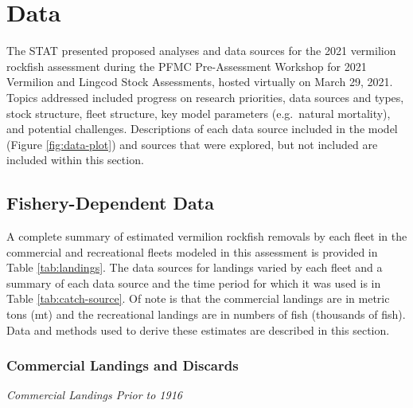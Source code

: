 \documentclass[
  english,
  a4paper,
]{article}
\begin{document}
\hypertarget{data}{%
\section{Data}\label{data}}

The STAT presented proposed analyses and data sources for the 2021 vermilion rockfish
assessment during the PFMC Pre-Assessment Workshop for 2021 Vermilion and
Lingcod Stock Assessments, hosted virtually on March 29, 2021. Topics addressed
included progress on research priorities, data sources and types, stock structure,
fleet structure, key model parameters (e.g.~natural mortality), and potential
challenges. Descriptions of each data source included in the model
(Figure \ref{fig:data-plot}) and sources that were explored, but not included
are included within this section.

\hypertarget{fishery-dependent-data}{%
\subsection{Fishery-Dependent Data}\label{fishery-dependent-data}}

A complete summary of estimated vermilion rockfish removals by each fleet in the
commercial and recreational fleets modeled in this assessment is provided in Table
\ref{tab:landings}. The data sources for landings varied by each fleet and a summary
of each data source and the time period for which it was used is in Table \ref{tab:catch-source}.
Of note is that the commercial landings are in metric tons (mt) and the recreational landings
are in numbers of fish (thousands of fish). Data and
methods used to derive these estimates are described in this section.

\hypertarget{commercial-landings-and-discards}{%
\subsubsection{Commercial Landings and Discards}\label{commercial-landings-and-discards}}

\emph{Commercial Landings Prior to 1916}
\end{document}
